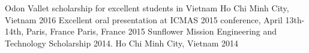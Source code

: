 



\begin{cvhonors}

  \cvhonor
    {Odon Vallet scholarship for excellent students in Vietnam} %
    {} %
    {Ho Chi Minh City, Vietnam} %
    {2016} %
  \cvhonor
    {Excellent oral presentation at ICMAS 2015 conference, April 13th-14th, Paris, France} %
    {} %
    {Paris, France} %
    {2015} %
  \cvhonor
    {Sunflower Mission Engineering and Technology Scholarship 2014.} %
    {} %
    {Ho Chi Minh City, Vietnam} %
    {2014} %
\end{cvhonors}
